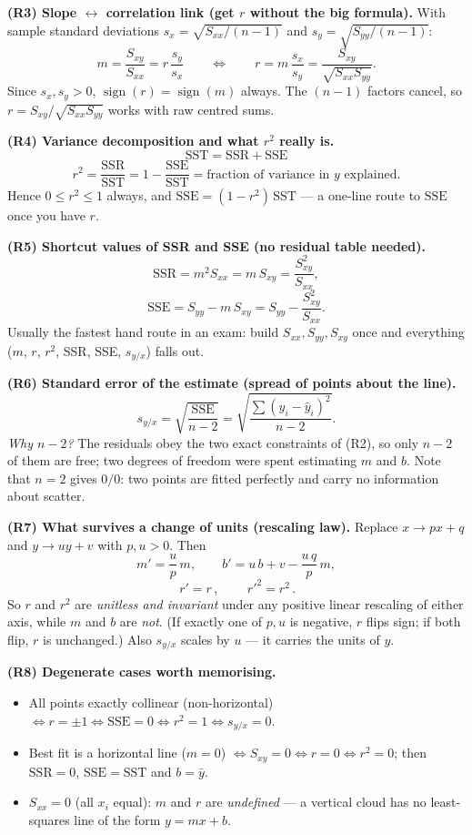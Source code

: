 \begin{derivedbox}
\medskip
\textbf{(R3) Slope $\leftrightarrow$ correlation link (get $r$ without the big formula).}
With sample standard deviations $s_x=\sqrt{S_{xx}/(n-1)}$ and $s_y=\sqrt{S_{yy}/(n-1)}$:
\[
  m=\frac{S_{xy}}{S_{xx}}=r\,\frac{s_y}{s_x}
  \qquad\Longleftrightarrow\qquad
  r=m\,\frac{s_x}{s_y}=\frac{S_{xy}}{\sqrt{S_{xx}S_{yy}}} .
\]
Since $s_x,s_y>0$, $\operatorname{sign}(r)=\operatorname{sign}(m)$ always.
The $(n-1)$ factors cancel, so $r=S_{xy}/\sqrt{S_{xx}S_{yy}}$ works with raw centred sums.

\medskip
\textbf{(R4) Variance decomposition and what $r^2$ really is.}
\[
  \mathrm{SST}=\mathrm{SSR}+\mathrm{SSE}
\]
\[
  r^2=\frac{\mathrm{SSR}}{\mathrm{SST}}=1-\frac{\mathrm{SSE}}{\mathrm{SST}}
  = \text{fraction of variance in } y \text{ explained.}
\]
Hence $0\le r^2\le 1$ always, and $\mathrm{SSE}=(1-r^2)\,\mathrm{SST}$ --- a one-line
route to $\mathrm{SSE}$ once you have $r$.

\medskip
\textbf{(R5) Shortcut values of SSR and SSE (no residual table needed).}
\[
  \mathrm{SSR}=m^2S_{xx}=m\,S_{xy}=\frac{S_{xy}^2}{S_{xx}},
\]
\[
  \mathrm{SSE}=S_{yy}-m\,S_{xy}=S_{yy}-\frac{S_{xy}^2}{S_{xx}} .
\]
Usually the fastest hand route in an exam: build $S_{xx},S_{yy},S_{xy}$ once and
everything ($m$, $r$, $r^2$, SSR, SSE, $s_{y/x}$) falls out.

\medskip
\textbf{(R6) Standard error of the estimate (spread of points about the line).}
\[
  s_{y/x}=\sqrt{\frac{\mathrm{SSE}}{n-2}}
        =\sqrt{\frac{\sum(y_i-\hat y_i)^2}{n-2}} .
\]
\emph{Why $n-2$?} The residuals obey the two exact constraints of (R2), so only $n-2$
of them are free; two degrees of freedom were spent estimating $m$ and $b$. Note that
$n=2$ gives $0/0$: two points are fitted perfectly and carry no information about scatter.

\medskip
\textbf{(R7) What survives a change of units (rescaling law).} Replace
$x\to px+q$ and $y\to uy+v$ with $p,u>0$. Then
\[
  m'=\frac{u}{p}\,m,\qquad b'=u\,b+v-\frac{u\,q}{p}\,m,
\]
\[
  \boxed{\,r'=r\,},\qquad \boxed{\,r'^2=r^2\,}.
\]
So $r$ and $r^2$ are \emph{unitless and invariant} under any positive linear rescaling of
either axis, while $m$ and $b$ are \emph{not}. (If exactly one of $p,u$ is negative, $r$
flips sign; if both flip, $r$ is unchanged.) Also $s_{y/x}$ scales by $u$ --- it carries
the units of $y$.

\medskip
\textbf{(R8) Degenerate cases worth memorising.}
\begin{itemize}
\item All points exactly collinear (non-horizontal) $\iff r=\pm1 \iff \mathrm{SSE}=0
      \iff r^2=1 \iff s_{y/x}=0$.
\item Best fit is a horizontal line ($m=0$) $\iff S_{xy}=0 \iff r=0 \iff r^2=0$;
      then $\mathrm{SSR}=0$, $\mathrm{SSE}=\mathrm{SST}$ and $b=\bar y$.
\item $S_{xx}=0$ (all $x_i$ equal): $m$ and $r$ are \emph{undefined} --- a vertical
      cloud has no least-squares line of the form $y=mx+b$.
\end{itemize}


\end{derivedbox}
